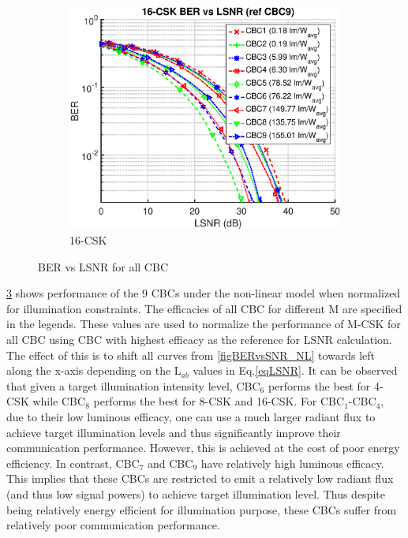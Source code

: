 \documentclass[10pt,letterpaper]{article}
\begin{document}
\begin{figure}[t]
\begin{subfigure}{0.32\textwidth}
			\label{fig8LSNR}
		\end{subfigure}
		\begin{subfigure}{0.32\textwidth}
		\centering
			\includegraphics[trim={0.1in 0.0in 0.5in 0.1in}, clip=true, width=\textwidth]{M16_16-CSK_BERvsLSNR_NL.eps}
			\caption{16-CSK}
			\label{fig16LSNR}
		\end{subfigure}
	\caption{BER vs LSNR for all CBC}
	\label{figBERvsLSNR}
\end{figure}

\figurename\ref{figBERvsLSNR} shows performance of the 9 CBCs under the non-linear model when normalized for illumination constraints. The efficacies of all CBC for different M are specified in the legends. These values are used to normalize the performance of M-CSK for all CBC using CBC with highest efficacy as the reference for LSNR calculation. The effect of this is to shift all curves from \figurename\ref{figBERvsSNR_NL} towards left along the x-axis depending on the L$_{ab}$ values in Eq.\eqref{eqLSNR}. It can be observed that given a target illumination intensity level, CBC$_{6}$ performs the best for 4-CSK while CBC$_{8}$ performs the best for 8-CSK and 16-CSK. For CBC$_{1}$-CBC$_{4}$, due to their low luminous efficacy, one can use a much larger radiant flux to achieve target illumination levels and thus significantly improve their communication performance. However, this is achieved at the cost of poor energy efficiency. In contrast, CBC$_{7}$ and CBC$_{9}$ have relatively high luminous efficacy. This implies that these CBCs are restricted to emit a relatively low radiant flux (and thus low signal powers) to achieve target illumination level. Thus despite being relatively energy efficient for illumination purpose, these CBCs suffer from relatively poor communication performance.
\end{document}
